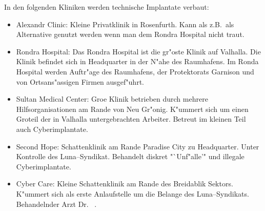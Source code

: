 In den folgenden Kliniken werden technische Implantate verbaut:

\begin{itemize}
    \item Alexandr Clinic: Kleine Privatklinik in Rosenfurth. Kann als z.B.~als Alternative genutzt werden wenn man dem Rondra Hospital nicht traut.
    \item Rondra Hospital: Das Rondra Hospital ist die gr"os\3te Klinik auf Valhalla. Die Klinik befindet sich in Headquarter in der N"ahe des Raumhafens. Im Ronda Hospital werden Auftr"age des Raumhafens, der Protektorats Garnison und von Ortsans"assigen Firmen ausgef"uhrt.
    \item Sultan Medical Center: Gro\3e Klinik betrieben durch mehrere Hilfsorganisationen am Rande von Neu Gr"onig. K"ummert sich um einen Gro\3teil der in Valhalla untergebrachten Arbeiter. Betreut im kleinen Teil auch Cyberimplantate.
    \item Second Hope: Schattenklinik am Rande Paradise City zu Headquarter. Unter Kontrolle des Luna--Syndikat. Behandelt diskret "`Unf"alle'" und illegale Cyberimplantate.
    \item {} Cyber Care: Kleine Schattenklinik am Rande des Breidablik Sektors. K"ummert sich als erste Anlaufstelle um die Belange des Luna--Syndikats. Behandelnder Arzt Dr.~ .
\end{itemize}